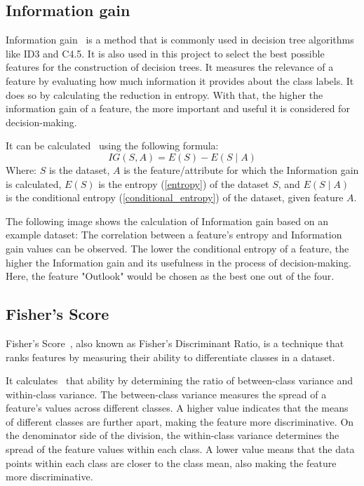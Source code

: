 \subsection{Information gain} \label{information_gain}
Information gain~\cite{feature_selection} is a method that is commonly used in decision tree algorithms like ID3 and C4.5. It is also used in this project to select the best possible features for the construction of decision trees. It measures the relevance of a feature by evaluating how much information it provides about the class labels. It does so by calculating the reduction in entropy. With that, the higher the information gain of a feature, the more important and useful it is considered for decision-making.

It can be calculated~\cite{information_gain_wiki} using the following formula:
\[IG(S, A) = {E(S)} - {E(S\mid A)}\]
Where: $S$ is the dataset, $A$ is the feature/attribute for which the Information gain is calculated, $E(S)$ is the entropy (\ref{entropy}) of the dataset $S$, and $E(S\mid A)$ is the conditional entropy (\ref{conditional_entropy}) of the dataset, given feature $A$.

The following image shows the calculation of Information gain based on an example dataset:
The correlation between a feature's entropy and Information gain values can be observed. The lower the conditional entropy of a feature, the higher the Information gain and its usefulness in the process of decision-making. Here, the feature "Outlook" would be chosen as the best one out of the four.



\subsection{Fisher's Score}
Fisher's Score~\cite{feature_selection}, also known as Fisher's Discriminant Ratio, is a technique that ranks features by measuring their ability to differentiate classes in a dataset.

It calculates~\cite{feature_selection_fishers_score} that ability by determining the ratio of between-class variance and within-class variance. The between-class variance measures the spread of a feature's values across different classes. A higher value indicates that the means of different classes are further apart, making the feature more discriminative. On the denominator side of the division, the within-class variance determines the spread of the feature values within each class. A lower value means that the data points within each class are closer to the class mean, also making the feature more discriminative.


